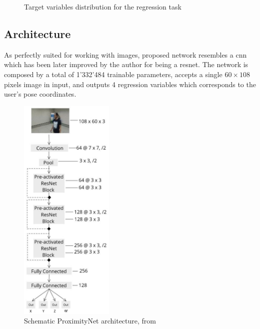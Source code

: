 \begin{figure}[!h]
\begin{center}
\begin{subfigure}[h]{0.24\textwidth}
		\end{subfigure}
	\end{center}
	\vspace{-0.5cm}
	\caption[Target variables distribution for the regression task]{Target variables distribution for the regression task}
	\label{fig:proximitynet-dataset-distribution-regr}
\end{figure}



\subsection{Architecture}
\label{subsec:proximitynet-architecture}


As perfectly suited for working with images, proposed network resembles a \gls{cnn} which has been later improved by the author for being a \gls{resnet}. The network is composed by a total of 1'332'484 trainable parameters, accepts a single $60 \times 108$ pixels image in input, and outputs 4 regression variables which corresponds to the user's pose coordinates.

\begin{figure}[!h]
	\centering
	\includegraphics[width=0.4\textwidth]{"contents/images/03-proximitynet-1A"}
	\caption[Schematic ProximityNet architecture]{Schematic ProximityNet architecture, from \cite{mantegazza2019visionbased}}
	\label{fig:proximitynet-architecture-1}
\end{figure}

